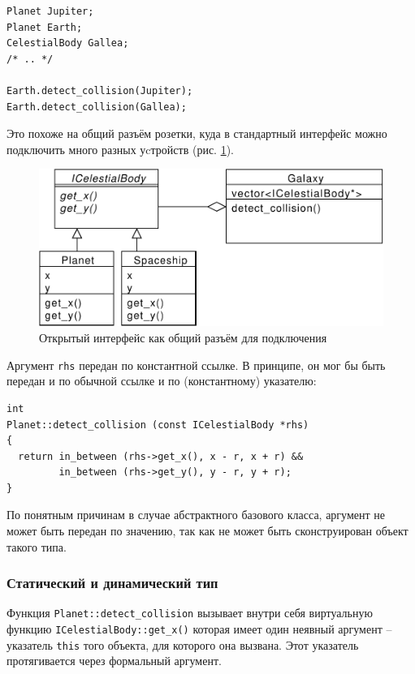 \documentclass[a4paper,12pt,oneside]{article}
\begin{document}
\begin{lstlisting}
Planet Jupiter;
Planet Earth;
CelestialBody Gallea;
/* .. */

Earth.detect_collision(Jupiter); 
Earth.detect_collision(Gallea);
\end{lstlisting}

Это похоже на общий разъём розетки, куда в стандартный интерфейс можно подключить много разных уcтройств (рис. \ref{fig:common-intf}).

\begin{figure}[ht]
\centering
\includegraphics[width=1.0\textwidth]{illustrations/common-intf-crop.pdf}
\caption{Открытый интерфейс как общий разъём для подключения}
\label{fig:common-intf}
\end{figure}

Аргумент \lstinline!rhs! передан по константной ссылке. В принципе, он мог бы быть передан и по обычной ссылке и по (константному) указателю:

\begin{lstlisting}
int 
Planet::detect_collision (const ICelestialBody *rhs)
{
  return in_between (rhs->get_x(), x - r, x + r) && 
         in_between (rhs->get_y(), y - r, y + r);
}
\end{lstlisting}

По понятным причинам в случае абстрактного базового класса, аргумент не может быть передан по значению, так как не может быть сконструирован объект такого типа.

\subsubsection{Статический и динамический тип}\label{StatDynPoly}

Функция \lstinline!Planet::detect_collision! вызывает внутри себя виртуальную функцию \lstinline!ICelestialBody::get_x()! которая имеет один неявный аргумент -- указатель \lstinline!this! того объекта, для которого она вызвана. Этот указатель протягивается через формальный аргумент. 
\end{document}
